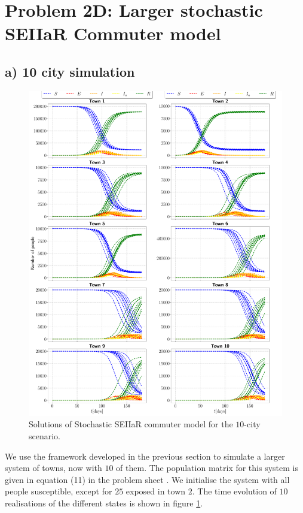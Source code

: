 \section{Problem 2D: Larger stochastic SEIIaR Commuter model}

\subsection{a) 10 city simulation}

\begin{figure}[htb]
	\centering
	\includegraphics[width=0.9\columnwidth]{../fig/2Ea_commuter.pdf}
	\caption{Solutions of Stochastic SEIIaR commuter model for the $10$-city scenario.}
	\label{fig:commuter_10city}
\end{figure}

We use the framework developed in the previous section to simulate a larger system of towns, now with $10$ of them. The population matrix for this system is given in equation (11) in the problem sheet \cite{sheet}. We initialise the system with all people susceptible, except for $25$ exposed in town $2$. The time evolution of $10$ realisations of the different states is shown in figure \ref{fig:commuter_10city}. 


